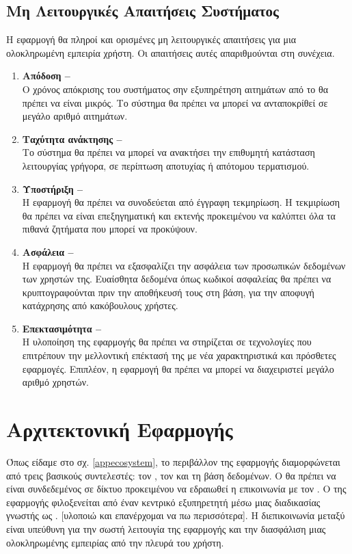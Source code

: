 \subsection{Μη Λειτουργικές Απαιτήσεις Συστήματος}
Η εφαρμογή θα πληροί και ορισμένες μη λειτουργικές απαιτήσεις για μια ολοκληρωμένη εμπειρία χρήστη. Οι απαιτήσεις αυτές απαριθμούνται στη συνέχεια.

\begin{enumerate}
    \item \textbf{Απόδοση -- } \\
    Ο χρόνος απόκρισης του συστήματος σην εξυπηρέτηση αιτημάτων από το  θα πρέπει να είναι μικρός. Το σύστημα θα πρέπει να μπορεί να ανταποκρίθεί σε μεγάλο αριθμό αιτημάτων.
    \item \textbf{Ταχύτητα ανάκτησης -- } \\
    Το σύστημα θα πρέπει να μπορεί να ανακτήσει την επιθυμητή κατάσταση λειτουργίας γρήγορα, σε περίπτωση αποτυχίας ή απότομου τερματισμού.
    \item \textbf{Υποστήριξη -- } \\
    Η εφαρμογή θα πρέπει να συνοδεύεται από έγγραφη τεκμηρίωση. Η τεκμιρίωση θα πρέπει να είναι επεξηγηματική και εκτενής προκειμένου να καλύπτει όλα τα πιθανά ζητήματα που μπορεί να προκύψουν.
    \item \textbf{Ασφάλεια -- } \\
    Η εφαρμογή θα πρέπει να εξασφαλίζει την ασφάλεια των προσωπικών δεδομένων των χρηστών της. Ευαίσθητα δεδομένα όπως κωδικοί ασφαλείας θα πρέπει να κρυπτογραφούνται πριν την αποθήκευσή τους στη βάση, για την αποφυγή κατάχρησης από κακόβουλους χρήστες.
    \item \textbf{Επεκτασιμότητα -- } \\
    Η υλοποίηση της εφαρμογής θα πρέπει να στηρίζεται σε τεχνολογίες που επιτρέπουν την μελλοντική επέκτασή της με νέα χαρακτηριστικά και πρόσθετες εφαρμογές. Επιπλέον, η εφαρμογή θα πρέπει να μπορεί να διαχειριστεί μεγάλο αριθμό χρηστών.
\end{enumerate}



\section{Αρχιτεκτονική Εφαρμογής}
Όπως είδαμε στο  σχ. \ref{appecosystem}, το περιβάλλον της εφαρμογής διαμορφώνεται από τρεις βασικούς συντελεστές: τον , τον  και τη βάση δεδομένων. Ο  θα πρέπει να είναι συνδεδεμένος σε δίκτυο προκειμένου να εδραιωθεί η επικοινωνία με τον . Ο  της εφαρμογής φιλοξενείται από έναν κεντρικό εξυπηρετητή μέσω μιας διαδικασίας γνωστής ως . [υλοποιώ και επανέρχομαι να πω περισσότερα]. Η διεπικοινωνία μεταξύ  είναι υπεύθυνη για την σωστή λειτουγία της εφαρμογής και την διασφάλιση μιας ολοκληρωμένης εμπειρίας από την πλευρά του χρήστη. 

